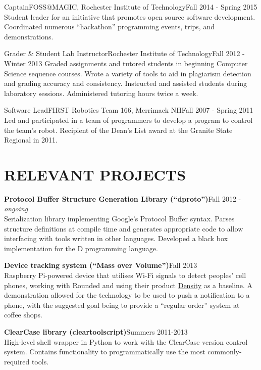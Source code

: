 \documentclass[line]{res}
\newcommand{\project}[2][]{{\bf #2}\hfill #1\\}
\def\ongoing{\textit{ongoing}}
\begin{document}
\begin{resume}
	\begin{job}{Captain}{FOSS@MAGIC, Rochester Institute of Technology}{Fall 2014 - Spring 2015}
		Student leader for an initiative that promotes open source software development.
		Coordinated numerous ``hackathon'' programming events, trips, and demonstrations.
	\end{job}

	\begin{job}{Grader \& Student Lab Instructor}{Rochester Institute of Technology}{Fall 2012 - Winter 2013}
		Graded assignments and tutored students in beginning Computer Science sequence courses.
		Wrote a variety of tools to aid in plagiarism detection and grading accuracy and consistency.
		Instructed and assisted students during laboratory sessions.
		Administered tutoring hours twice a week.
	\end{job}

	\begin{job}{Software Lead}{FIRST Robotics Team 166, Merrimack NH}{Fall 2007 - Spring 2011}
		Led and participated in a team of programmers to develop a program to control the team's robot.
		Recipient of the Dean's List award at the Granite State Regional in 2011.
	\end{job}

\section{RELEVANT PROJECTS}

	\project[Fall 2012 - \ongoing]   {Protocol Buffer Structure Generation Library (``dproto'')}
	Serialization library implementing Google's Protocol Buffer syntax.
	Parses structure definitions at compile time and generates appropriate code to allow interfacing with tools written in other languages.
	Developed a black box implementation for the D programming language.

	\project[Fall 2013]              {Device tracking system (``Mass over Volume'')}
	Raspberry Pi-powered device that utilises Wi-Fi signals to detect peoples' cell phones, working with Rounded and using their product \href{http://density.io}{Density} as a baseline.
	A demonstration allowed for the technology to be used to push a notification to a phone, with the suggested goal being to provide a ``regular order'' system at coffee shops.

	\project[Summers 2011-2013]      {ClearCase library (cleartoolscript)}
	High-level shell wrapper in Python to work with the ClearCase version control system.
	Contains functionality to programmatically use the most commonly-required tools.


\end{resume}
\end{document}
